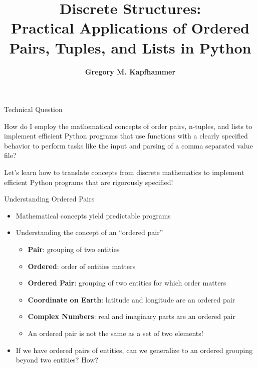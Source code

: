 \documentclass[14pt,aspectratio=169]{beamer}
\title{Discrete Structures: \\ Practical Applications of Ordered Pairs, Tuples,
and Lists in Python}
\author{{\bf Gregory M. Kapfhammer}}
\institute[shortinst]{{\bf Department of Computer Science, Allegheny College}}
\begin{document}
{
  \begin{frame}
    \titlepage
  \end{frame}
}

%
\begin{frame}{Technical Question}
  \hspace*{.25in}
  \begin{minipage}{5in}
  \vspace*{.1in}
  \begin{center}
    {\large How do I employ the mathematical concepts of order pairs, n-tuples,
      and lists to implement efficient Python programs that use
      functions with a clearly specified behavior to perform tasks like the
      input and parsing of a comma separated value file?}
  \end{center}
  \end{minipage}
  \vspace{2ex}
  \begin{center}
    \small Let's learn how to translate concepts from discrete mathematics to
    implement efficient Python programs that are rigorously specified!
  \end{center}
\end{frame}

%
\begin{frame}{Understanding Ordered Pairs}
  \begin{itemize}
    \item Mathematical concepts yield predictable programs
      \vspace*{-.15in}
    \item Understanding the concept of an ``ordered pair''
      \begin{itemize}
        \item {\bf Pair}: grouping of two entities
        \item {\bf Ordered}: order of entities matters
        \item {\bf Ordered Pair}: grouping of two entities for which order
          matters
        \item {\bf Coordinate on Earth}: latitude and longitude are an ordered
          pair
        \item {\bf Complex Numbers}: real and imaginary parts are an ordered
          pair
        \item An ordered pair is not the same as a set of two elements!
      \end{itemize}
      \vspace*{-.2in}
    \item If we have ordered pairs of entities, can we generalize to
      an ordered grouping beyond two entities? How?
  \end{itemize}
\end{frame}
\end{document}
